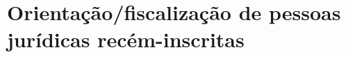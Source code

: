 \chapter{Orientação/fiscalização de pessoas jurídicas recém-inscritas}
\label{chap:of-orientacao_pj}